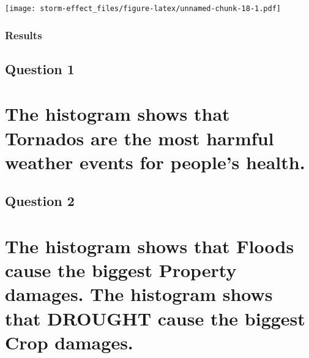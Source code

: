 \documentclass[
]{article}
\begin{document}
\texttt{[image: storm-effect\_files/figure-latex/unnamed-chunk-18-1.pdf]}

\hypertarget{results}{%
\subsubsection{Results}\label{results}}

\hypertarget{question-1}{%
\subsection{Question 1}\label{question-1}}

\hypertarget{the-histogram-shows-that-tornados-are-the-most-harmful-weather-events-for-peoples-health.}{%
\section{The histogram shows that Tornados are the most harmful weather
events for people's
health.}\label{the-histogram-shows-that-tornados-are-the-most-harmful-weather-events-for-peoples-health.}}

\hypertarget{question-2}{%
\subsection{Question 2}\label{question-2}}

\hypertarget{the-histogram-shows-that-floods-cause-the-biggest-property-damages.-the-histogram-shows-that-drought-cause-the-biggest-crop-damages.}{%
\section{The histogram shows that Floods cause the biggest Property
damages. The histogram shows that DROUGHT cause the biggest Crop
damages.}\label{the-histogram-shows-that-floods-cause-the-biggest-property-damages.-the-histogram-shows-that-drought-cause-the-biggest-crop-damages.}}
\end{document}
